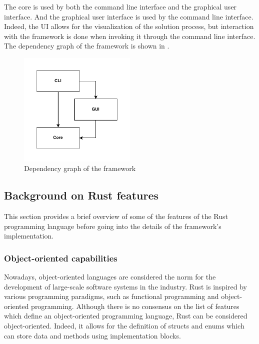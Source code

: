 The core is used by both the command line interface and the graphical user interface. And the graphical user interface is used by the command line interface.
Indeed, the UI allows for the visualization of the solution process, but interaction with the framework is done when invoking it through the command line interface.
The dependency graph of the framework is shown in .

\begin{figure}
    \centering
    \includegraphics[width=0.5\textwidth]{Pictures/dependency}
    \caption{Dependency graph of the framework}
    \label{fig:dependency_graph}
\end{figure}

\subsection{Background on Rust features}

This section provides a brief overview of some of the features of the Rust programming language before going into the details of the framework's implementation.

\subsubsection{Object-oriented capabilities}

Nowadays, object-oriented languages are considered the norm for the development of large-scale software systems in the industry.
Rust is inspired by various programming paradigms, such as functional programming and object-oriented programming.
Although there is no consensus on the list of features which define an object-oriented programming language, Rust can be considered object-oriented.
Indeed, it allows for the definition of structs and enums which can store data and methods using implementation blocks.

